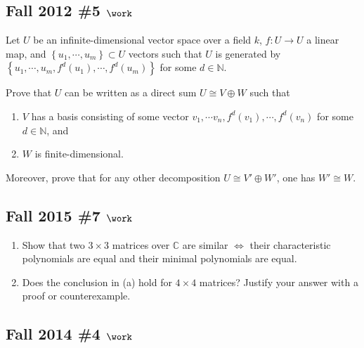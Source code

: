 \hypertarget{fall-2012-5-work}{%
\subsection{\texorpdfstring{Fall 2012 \#5
\(\work\)}{Fall 2012 \#5 \textbackslash work}}\label{fall-2012-5-work}}

Let \(U\) be an infinite-dimensional vector space over a field \(k\),
\(f: U\to U\) a linear map, and
\(\left\{{u_1, \cdots, u_m}\right\} \subset U\) vectors such that \(U\)
is generated by
\(\left\{{u_1, \cdots, u_m, f^d(u_1), \cdots, f^d(u_m)}\right\}\) for
some \(d\in {\mathbb{N}}\).

Prove that \(U\) can be written as a direct sum \(U \cong V\oplus W\)
such that

\begin{enumerate}
\def\labelenumi{\arabic{enumi}.}
\tightlist
\item
  \(V\) has a basis consisting of some vector
  \(v_1, \cdots v_n, f^d(v_1), \cdots, f^d(v_n)\) for some
  \(d\in {\mathbb{N}}\), and
\item
  \(W\) is finite-dimensional.
\end{enumerate}

Moreover, prove that for any other decomposition
\(U \cong V' \oplus W'\), one has \(W' \cong W\).

\hypertarget{fall-2015-7-work}{%
\subsection{\texorpdfstring{Fall 2015 \#7
\(\work\)}{Fall 2015 \#7 \textbackslash work}}\label{fall-2015-7-work}}

\begin{enumerate}
\def\labelenumi{\alph{enumi}.}
\item
  Show that two \(3\times 3\) matrices over \({\mathbb{C}}\) are similar
  \(\iff\) their characteristic polynomials are equal and their minimal
  polynomials are equal.
\item
  Does the conclusion in (a) hold for \(4\times 4\) matrices? Justify
  your answer with a proof or counterexample.
\end{enumerate}

\hypertarget{fall-2014-4-work}{%
\subsection{\texorpdfstring{Fall 2014 \#4
\(\work\)}{Fall 2014 \#4 \textbackslash work}}\label{fall-2014-4-work}}

